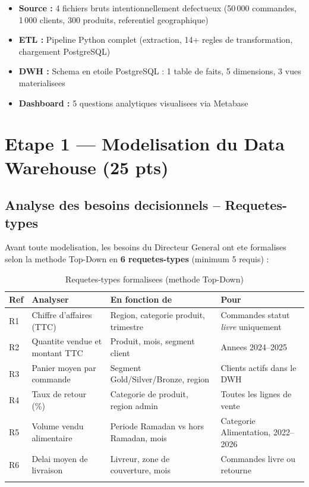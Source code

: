 \documentclass[12pt,a4paper]{article}
\begin{document}
\begin{infobox}[title=Perimetre du projet]
\begin{itemize}[leftmargin=*]
  \item \textbf{Source :} 4 fichiers bruts intentionnellement defectueux (50\,000 commandes, 1\,000 clients, 300 produits, referentiel geographique)
  \item \textbf{ETL :} Pipeline Python complet (extraction, 14+ regles de transformation, chargement PostgreSQL)
  \item \textbf{DWH :} Schema en etoile PostgreSQL : 1 table de faits, 5 dimensions, 3 vues materialisees
  \item \textbf{Dashboard :} 5 questions analytiques visualisees via Metabase
\end{itemize}
\end{infobox}

\newpage

\section{Etape 1 --- Modelisation du Data Warehouse (25 pts)}

\subsection{Analyse des besoins decisionnels -- Requetes-types}

Avant toute modelisation, les besoins du Directeur General ont ete formalises
selon la methode Top-Down en \textbf{6 requetes-types} (minimum 5 requis) :

\begin{longtable}{p{0.7cm} p{3.5cm} p{4cm} p{4cm}}
\toprule
\textbf{Ref} & \textbf{Analyser} & \textbf{En fonction de} & \textbf{Pour}\\
\midrule
\endhead
R1 & Chiffre d'affaires (TTC) & Region, categorie produit, trimestre &
     Commandes statut \textit{livre} uniquement\\[0.25cm]
R2 & Quantite vendue et montant TTC & Produit, mois, segment client &
     Annees 2024--2025\\[0.25cm]
R3 & Panier moyen par commande & Segment Gold/Silver/Bronze, region &
     Clients actifs dans le DWH\\[0.25cm]
R4 & Taux de retour (\%) & Categorie de produit, region admin &
     Toutes les lignes de vente\\[0.25cm]
R5 & Volume vendu alimentaire & Periode Ramadan vs hors Ramadan, mois &
     Categorie Alimentation, 2022--2026\\[0.25cm]
R6 & Delai moyen de livraison & Livreur, zone de couverture, mois &
     Commandes livre ou retourne\\
\bottomrule
\caption{Requetes-types formalisees (methode Top-Down)}
\end{longtable}
\end{document}
